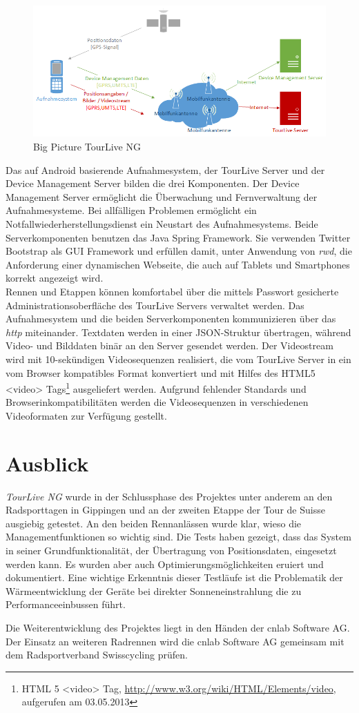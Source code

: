\begin{figure}[H]
	\centering
	\includegraphics[width=140mm]{images/android/BigPicture_AndroidClient.png} 
	\caption{Big Picture TourLive NG}
	\label{fig:bigpictureandroid}
\end{figure}
Das auf Android basierende Aufnahmesystem, der TourLive Server und der Device Management Server bilden die drei Komponenten. Der Device Management Server ermöglicht die Überwachung und Fernverwaltung der Aufnahmesysteme. Bei allfälligen Problemen ermöglicht ein Notfallwiederherstellungsdienst ein Neustart des Aufnahmesystems. Beide Serverkomponenten benutzen das  Java Spring Framework. Sie verwenden Twitter Bootstrap als GUI Framework und erfüllen damit, unter Anwendung von \textit{\gls{rwd}}, die Anforderung einer dynamischen Webseite, die auch auf Tablets und Smartphones korrekt angezeigt wird. 
\\

Rennen und Etappen können komfortabel über die mittels Passwort gesicherte Administrationsoberfläche des TourLive Servers verwaltet werden. Das Aufnahmesystem und die beiden Serverkomponenten kommunizieren über das \textit{\gls{http}} miteinander. Textdaten werden in einer JSON-Struktur übertragen, während Video- und Bilddaten binär an den Server gesendet  werden. Der Videostream wird mit 10-sekündigen Videosequenzen realisiert, die vom TourLive Server in ein vom Browser kompatibles Format konvertiert und mit Hilfes des HTML5 <video> Tags\footnote{HTML 5 <video> Tag,  \url{http://www.w3.org/wiki/HTML/Elements/video}, aufgerufen am 03.05.2013} ausgeliefert werden. Aufgrund fehlender Standards und Browserinkompatibilitäten werden die Videosequenzen in verschiedenen Videoformaten zur Verfügung gestellt.

\pagebreak
\section*{Ausblick}
\textit{TourLive NG} wurde in der Schlussphase des Projektes unter anderem an den Radsporttagen in Gippingen und an der zweiten Etappe der Tour de Suisse ausgiebig getestet. An den beiden Rennanlässen wurde klar, wieso die Managementfunktionen so wichtig sind. Die Tests haben gezeigt, dass das System in seiner Grundfunktionalität, der Übertragung von Positionsdaten, eingesetzt werden kann. Es wurden aber auch Optimierungsmöglichkeiten eruiert und dokumentiert. Eine wichtige Erkenntnis dieser Testläufe ist die Problematik der Wärmeentwicklung der Geräte bei direkter Sonneneinstrahlung die zu Performanceeinbussen führt.

Die Weiterentwicklung des Projektes liegt in den Händen der cnlab Software AG. Der Einsatz an weiteren Radrennen wird die cnlab Software AG gemeinsam mit dem Radsportverband Swisscycling prüfen.

